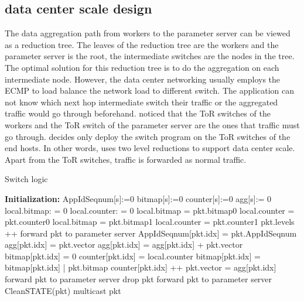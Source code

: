 \subsection{data center scale design}
The data aggregation path from workers to the parameter server can be viewed as a reduction tree.
The leaves of the reduction tree are the workers and the parameter server is the root, the intermediate 
switches are the nodes in the tree. 
The optimal solution for this reduction tree is to do the aggregation on each intermediate node. 
However, the data center networking usually employs the ECMP to load balance the network load to different switch.
The application can not know which next hop intermediate switch their traffic or the aggregated traffic would go through beforehand.
\system noticed that the ToR switches of the workers and the ToR switch of the parameter server
are the ones that \system traffic must go through.
\system decides only deploy the switch program on the ToR switches of the end hosts.
In other words, \system uses two level reductions to support data center scale.
Apart from the ToR switches, \system traffic is forwarded as normal traffic.

\begin{algorithm}[ht!]
    \caption{\system Switch logic}
    \begin{algorithmic}[1]
        \STATE \textbf{Initialization:}
		\STATE AppIdSeqnum[s]:={0}
		\STATE bitmap[s]:={0}
		\STATE counter[s]:={0}
		\STATE agg[s]:= {0}
        \STATE local.bitmap: = 0
        \STATE local.counter: = 0
		\vspace{4mm}
		\STATE local.bitmap  = pkt.bitmap0 
		\STATE local.counter  = pkt.counter0
		\ELSE
		\STATE local.bitmap  = pkt.bitmap1 
		\STATE local.counter  = pkt.counter1
		\ENDIF
		\STATE pkt.levels ++
		\STATE  forward pkt to parameter server
		\ENDIF 
		\STATE AppIdSeqnum[pkt.idx] = pkt.AppIdSeqnum
		\ENDIF
		\STATE agg[pkt.idx] = pkt.vector
		\ELSE 
		\STATE agg[pkt.idx] = agg[pkt.idx] + pkt.vector
		\ENDIF
		\ENDIF
		\STATE bitmap[pkt.idx] = 0  
		\STATE counter[pkt.idx] = local.counter 
		\ELSE 
		\STATE bitmap[pkt.idx] = bitmap[pkt.idx] | pkt.bitmap
		\STATE counter[pkt.idx] ++ 
		\ENDIF
		\STATE  pkt.vector = agg[pkt.idx]
		\STATE  forward pkt to parameter server
		\ELSE
		\STATE drop pkt
        \ENDIF
        \ELSE
		\STATE forward pkt to parameter server 
		\ENDIF
		\ELSE
		\STATE CleanSTATE(pkt)
		\STATE multicast pkt
		\ENDIF
	\end{algorithmic}
    \label{algo:scheduler-switch-dc-scale}
    \end{algorithm}

